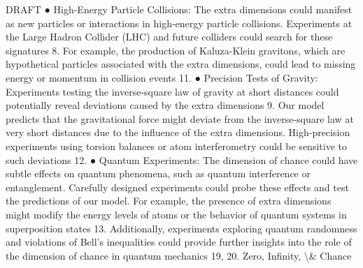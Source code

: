 \documentclass[12pt]{article}
\begin{document}
DRAFT
●
High-Energy Particle Collisions: The extra dimensions could manifest as new particles or
interactions in high-energy particle collisions. Experiments at the Large Hadron Collider
(LHC) and future colliders could search for these signatures 8. For example, the production
of Kaluza-Klein gravitons, which are hypothetical particles associated with the extra
dimensions, could lead to missing energy or momentum in collision events 11.
●
Precision Tests of Gravity: Experiments testing the inverse-square law of gravity at short
distances could potentially reveal deviations caused by the extra dimensions 9. Our model
predicts that the gravitational force might deviate from the inverse-square law at very short
distances due to the inﬂuence of the extra dimensions. High-precision experiments using
torsion balances or atom interferometry could be sensitive to such deviations 12.
●
Quantum Experiments: The dimension of chance could have subtle eﬀects on quantum
phenomena, such as quantum interference or entanglement. Carefully designed
experiments could probe these eﬀects and test the predictions of our model. For example,
the presence of extra dimensions might modify the energy levels of atoms or the behavior of
quantum systems in superposition states 13. Additionally, experiments exploring quantum
randomness and violations of Bell's inequalities could provide further insights into the role
of the dimension of chance in quantum mechanics 19, 20.
Zero, Infinity, \textbackslash{}& Chance
\end{document}
